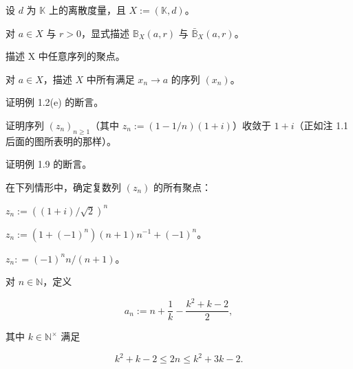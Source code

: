 \exerciseshead

\begin{exercises}
\item

设 $d$ 为 $\mathbb{K}$ 上的离散度量，且 $X := (\mathbb{K}, d)$。

\begin{items}
\item

对  $ a \in X $ 与  $ r > 0 $，显式描述  $ \mathbb{B}_X(a, r) $ 与  $ \bar{\mathbb{B}}_X(a, r) $。

\item

描述 X 中任意序列的聚点。

\item

对  $ a \in X $，描述  $ X $ 中所有满足  $ x_n \to a $ 的序列  $ (x_n) $。

\end{items}

\item

证明例 1.2(e) 的断言。

\item

证明序列  $ (z_n)_{n \geq 1} $（其中  $ z_n := (1 - 1/n)(1 + i) $）收敛于  $ 1 + i $（正如注 1.1 后面的图所表明的那样）。

\item

证明例 1.9 的断言。

\item

在下列情形中，确定复数列  $ (z_{n}) $ 的所有聚点：

\begin{items}
\item

$ z_n := \left( (1 + i) / \sqrt{2} \right)^n $

\item

$ z_n := (1 + (-1)^n)(n + 1)n^{-1} + (-1)^n $。

\item

$ z_n: = (-1)^n n / (n + 1) $。

\end{items}

\item

对  $ n \in \mathbb{N} $，定义

\[
a_{n}:=n+\frac{1}{k}-\frac{k^{2}+k-2}{2},
\]

其中  $ k \in \mathbb{N}^\times $ 满足

\[
k^{2}+k-2\leq2n\leq k^{2}+3k-2.
\]
\end{exercises}

